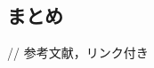 \documentclass{ltjsarticle}
\begin{document}
\subsection{まとめ}

// 参考文献，リンク付き
\begin{thebibliography}{9}
\end{thebibliography}
\end{document}
